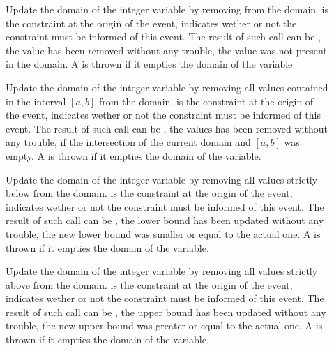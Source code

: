 \begin{description}
\item[ ] 

Update the domain of the integer variable by removing  from the domain.  is the constraint at the origin of the event,  indicates wether or not the  constraint must be informed of this event. The result of such call can be , the value has been removed without any trouble,  the value was not present in the domain. A  is thrown if it empties the domain of the variable

\item[ ] 

Update the domain of the integer variable by removing all values contained in the interval $[a,b]$ from the domain.  is the constraint at the origin of the event,  indicates wether or not the  constraint must be informed of this event. The result of such call can be , the values has been removed without any trouble,  if the intersection of the current domain and $[a,b]$ was empty. A  is thrown if it empties the domain of the variable.

\item[ ]  

Update the domain of the integer variable by removing all values strictly below  from the domain.  is the constraint at the origin of the event,  indicates wether or not the  constraint must be informed of this event. The result of such call can be , the lower bound has been updated without any trouble,  the new lower bound was smaller or equal to the actual one. A  is thrown if it empties the domain of the variable.

\item[ ]  

Update the domain of the integer variable by removing all values strictly above  from the domain.  is the constraint at the origin of the event,  indicates wether or not the  constraint must be informed of this event. The result of such call can be , the upper bound has been updated without any trouble,  the new upper bound was greater or equal to the actual one. A  is thrown if it empties the domain of the variable. 


\end{description}
